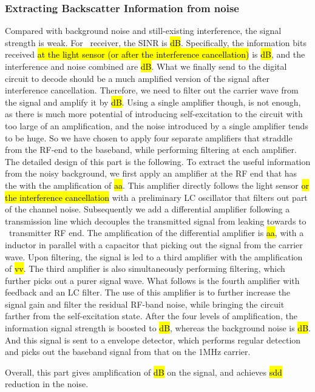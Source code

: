 \subsubsection{Extracting Backscatter Information from noise}
Compared with background noise and still-existing interference, the signal strength is weak. For \reader\ receiver, the SINR is \hl{dB}. Specifically, the information bits received \hl{at the light sensor (or after the interference cancellation)} is \hl{dB}, and the interference and noise combined are \hl{dB}. What we finally send to the digital circuit to decode should be a much amplified version of the signal after interference cancellation. Therefore, we need to filter out the carrier wave from the signal and amplify it by \hl{dB}. Using a single amplifier though, is not enough, as there is much more potential of introducing self-excitation to the circuit with too large of an amplification, and the noise introduced by a single amplifier tends to be huge. So we have chosen to apply four separate amplifiers that straddle from the RF-end to the baseband, while performing filtering at each amplifier. The detailed design of this part is the following. To extract the useful information from the noisy background, we first apply an amplifier at the RF end that has the with the amplification of \hl{aa}. This amplifier directly follows the light sensor \hl{or the interference cancellation} with a preliminary LC oscillator that filters out part of the channel noise. Subsequently we add a differential amplifier following a transmission line which decouples the transmitted signal from leaking towards to \reader\ transmitter RF end. The amplification of the differential amplifier is \hl{aa}, with a inductor in parallel with a capacitor that picking out the signal from the carrier wave. Upon filtering, the signal is led to a third amplifier with the amplification of \hl{vv}. The third amplifier is also simultaneously performing filtering, which further picks out a purer signal wave. What follows is the fourth amplifier with feedback and an LC filter. The use of this amplifier is to further increase the signal gain and filter the residual RF-band noise, while bringing the circuit farther from the self-excitation state. After the four levels of amplification, the information signal strength is boosted to \hl{dB}, whereas the background noise is \hl{dB}. And this signal is sent to a envelope detector, which performs regular detection and picks out the baseband signal from that on the 1MHz carrier. 

Overall, this part gives amplification of \hl{dB} on the signal, and achieves \hl{sdd} reduction in the noise. 

